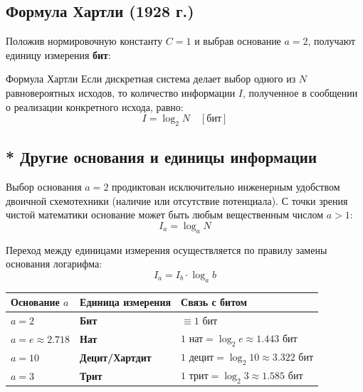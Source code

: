 \documentclass[11pt,a4paper]{article}
\begin{document}
\subsection{Формула Хартли (1928 г.)}
Положив нормировочную константу $C = 1$ и выбрав основание $a = 2$, получают единицу измерения \textbf{бит}:
\begin{definitionbox}{Формула Хартли}
Если дискретная система делает выбор одного из $N$ равновероятных исходов, то количество информации $I$, полученное в сообщении о реализации конкретного исхода, равно:
$$I = \log_2 N \quad [\text{бит}]$$
\end{definitionbox}

\subsection{* Другие основания и единицы информации}
Выбор основания $a = 2$ продиктован исключительно инженерным удобством двоичной схемотехники (наличие или отсутствие потенциала). С точки зрения чистой математики основание может быть любым вещественным числом $a > 1$:
$$I_a = \log_a N$$

Переход между единицами измерения осуществляется по правилу замены основания логарифма:
$$I_a = I_b \cdot \log_a b$$

\begin{table}[h!]
\centering
\begin{tabular}{@{}lll@{}}
\toprule
\textbf{Основание $a$} & \textbf{Единица измерения} & \textbf{Связь с битом} \\ \midrule
$a = 2$ & \textbf{Бит} & $\equiv 1$ бит \\
$a = e \approx 2.718$ & \textbf{Нат} & $1 \text{ нат} = \log_2 e \approx 1.443 \text{ бит}$ \\
$a = 10$ & \textbf{Децит/Хартдит} & $1 \text{ децит} = \log_2 10 \approx 3.322 \text{ бит}$ \\
$a = 3$ & \textbf{Трит} & $1 \text{ трит} = \log_2 3 \approx 1.585 \text{ бит}$ \\ \bottomrule
\end{tabular}
\end{table}
\end{document}
